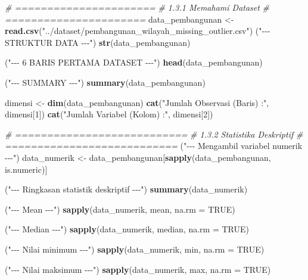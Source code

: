 \documentclass[
  12pt,
]{article}
\newenvironment{Shaded}{\begin{snugshade}}{\end{snugshade}}
\newcommand{\AttributeTok}[1]{\textcolor[rgb]{0.13,0.29,0.53}{#1}}
\newcommand{\CommentTok}[1]{\textcolor[rgb]{0.56,0.35,0.01}{\textit{#1}}}
\newcommand{\ConstantTok}[1]{\textcolor[rgb]{0.56,0.35,0.01}{#1}}
\newcommand{\DecValTok}[1]{\textcolor[rgb]{0.00,0.00,0.81}{#1}}
\newcommand{\FunctionTok}[1]{\textcolor[rgb]{0.13,0.29,0.53}{\textbf{#1}}}
\newcommand{\NormalTok}[1]{#1}
\newcommand{\OtherTok}[1]{\textcolor[rgb]{0.56,0.35,0.01}{#1}}
\newcommand{\StringTok}[1]{\textcolor[rgb]{0.31,0.60,0.02}{#1}}
\begin{document}
\begin{Shaded}
\begin{Highlighting}[]
\CommentTok{\# ======================}
\CommentTok{\# 1.3.1 Memahami Dataset}
\CommentTok{\# ======================}
\NormalTok{data\_pembangunan }\OtherTok{\textless{}{-}} \FunctionTok{read.csv}\NormalTok{(}\StringTok{"../dataset/pembangunan\_wilayah\_missing\_outlier.csv"}\NormalTok{)}
\NormalTok{(}\StringTok{"{-}{-}{-} STRUKTUR DATA {-}{-}{-}"}\NormalTok{)}
\FunctionTok{str}\NormalTok{(data\_pembangunan)}

\NormalTok{(}\StringTok{"{-}{-}{-} 6 BARIS PERTAMA DATASET {-}{-}{-}"}\NormalTok{)}
\FunctionTok{head}\NormalTok{(data\_pembangunan)}

\NormalTok{(}\StringTok{"{-}{-}{-} SUMMARY {-}{-}{-}"}\NormalTok{)}
\FunctionTok{summary}\NormalTok{(data\_pembangunan)}

\NormalTok{dimensi }\OtherTok{\textless{}{-}} \FunctionTok{dim}\NormalTok{(data\_pembangunan)}
\FunctionTok{cat}\NormalTok{(}\StringTok{"Jumlah Observasi (Baris) :"}\NormalTok{, dimensi[}\DecValTok{1}\NormalTok{])}
\FunctionTok{cat}\NormalTok{(}\StringTok{"Jumlah Variabel (Kolom)  :"}\NormalTok{, dimensi[}\DecValTok{2}\NormalTok{])}

\CommentTok{\# ===========================}
\CommentTok{\# 1.3.2 Statistika Deskriptif}
\CommentTok{\# ===========================}
\NormalTok{(}\StringTok{"{-}{-}{-} Mengambil variabel numerik {-}{-}{-}"}\NormalTok{)}
\NormalTok{data\_numerik }\OtherTok{\textless{}{-}}\NormalTok{ data\_pembangunan[}\FunctionTok{sapply}\NormalTok{(data\_pembangunan, is.numeric)]}

\NormalTok{(}\StringTok{"{-}{-}{-} Ringkasan statistik deskriptif {-}{-}{-}"}\NormalTok{)}
\FunctionTok{summary}\NormalTok{(data\_numerik)}

\NormalTok{(}\StringTok{"{-}{-}{-} Mean {-}{-}{-}"}\NormalTok{)}
\FunctionTok{sapply}\NormalTok{(data\_numerik, mean, }\AttributeTok{na.rm =} \ConstantTok{TRUE}\NormalTok{)}

\NormalTok{(}\StringTok{"{-}{-}{-} Median {-}{-}{-}"}\NormalTok{)}
\FunctionTok{sapply}\NormalTok{(data\_numerik, median, }\AttributeTok{na.rm =} \ConstantTok{TRUE}\NormalTok{)}

\NormalTok{(}\StringTok{"{-}{-}{-} Nilai minimum {-}{-}{-}"}\NormalTok{)}
\FunctionTok{sapply}\NormalTok{(data\_numerik, min, }\AttributeTok{na.rm =} \ConstantTok{TRUE}\NormalTok{)}

\NormalTok{(}\StringTok{"{-}{-}{-} Nilai maksimum {-}{-}{-}"}\NormalTok{)}
\FunctionTok{sapply}\NormalTok{(data\_numerik, max, }\AttributeTok{na.rm =} \ConstantTok{TRUE}\NormalTok{)}


\end{Highlighting}
\end{Shaded}
\end{document}
